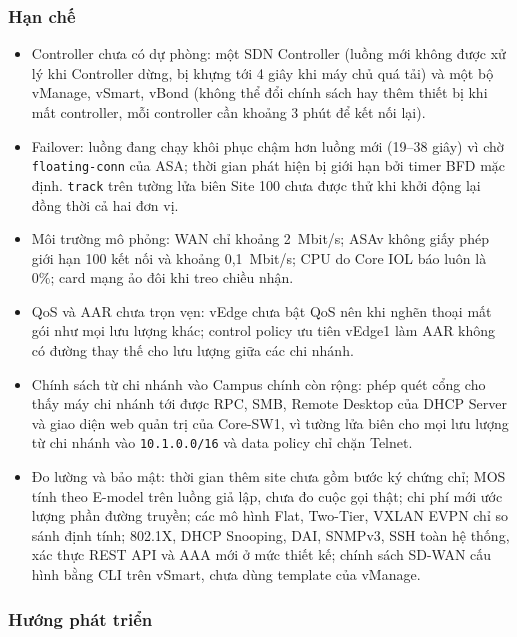 \subsubsection{Hạn chế}

\begin{itemize}
    \item Controller chưa có dự phòng: một SDN Controller (luồng mới không được xử lý khi Controller dừng, bị khựng tới 4 giây khi máy chủ quá tải) và một bộ vManage, vSmart, vBond (không thể đổi chính sách hay thêm thiết bị khi mất controller, mỗi controller cần khoảng 3 phút để kết nối lại).
    \item Failover: luồng đang chạy khôi phục chậm hơn luồng mới (19--38 giây) vì chờ \texttt{floating-conn} của ASA; thời gian phát hiện bị giới hạn bởi timer BFD mặc định. \texttt{track} trên tường lửa biên Site 100 chưa được thử khi khởi động lại đồng thời cả hai đơn vị.
    \item Môi trường mô phỏng: WAN chỉ khoảng 2~Mbit/s; ASAv không giấy phép giới hạn 100 kết nối và khoảng 0,1~Mbit/s; CPU do Core IOL báo luôn là 0\%; card mạng ảo đôi khi treo chiều nhận.
    \item QoS và AAR chưa trọn vẹn: vEdge chưa bật QoS nên khi nghẽn thoại mất gói như mọi lưu lượng khác; control policy ưu tiên vEdge1 làm AAR không có đường thay thế cho lưu lượng giữa các chi nhánh.
    \item Chính sách từ chi nhánh vào Campus chính còn rộng: phép quét cổng cho thấy máy chi nhánh tới được RPC, SMB, Remote Desktop của DHCP Server và giao diện web quản trị của Core-SW1, vì tường lửa biên cho mọi lưu lượng từ chi nhánh vào \texttt{10.1.0.0/16} và data policy chỉ chặn Telnet.
    \item Đo lường và bảo mật: thời gian thêm site chưa gồm bước ký chứng chỉ; MOS tính theo E-model trên luồng giả lập, chưa đo cuộc gọi thật; chi phí mới ước lượng phần đường truyền; các mô hình Flat, Two-Tier, VXLAN EVPN chỉ so sánh định tính; 802.1X, DHCP Snooping, DAI, SNMPv3, SSH toàn hệ thống, xác thực REST API và AAA mới ở mức thiết kế; chính sách SD-WAN cấu hình bằng CLI trên vSmart, chưa dùng template của vManage.
\end{itemize}

\subsubsection{Hướng phát triển}

